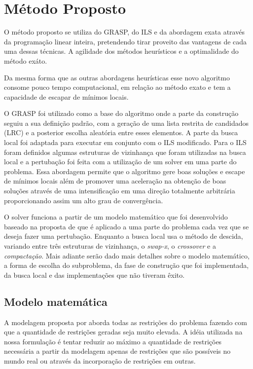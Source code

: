 \chapter{Método Proposto}
  
O método proposto se utiliza do GRASP, do ILS e da abordagem exata através da
programação linear inteira, pretendendo tirar proveito das vantagens de cada
uma dessas técnicas. A agilidade dos métodos heurísticos e a optimalidade do
método exáto.
  
Da mesma forma que as outras abordagens heurísticas esse novo algoritmo
consome pouco tempo computacional, em relação ao método exato e tem a capacidade
de escapar de mínimos locais.
  
O GRASP foi utilizado como a base do algoritmo onde a parte da construção
seguiu a sua definição padrão, com a geração de uma lista restrita de candidados
(LRC) e a posterior escolha aleatória entre esses elementos. A parte da busca
local foi adaptada para executar em conjunto com o ILS modificado. Para o ILS
foram definidos algumas estruturas de vizinhança que foram utilizadas
na busca local e a pertubação foi feita com a utilização de um solver em uma
parte do problema. Essa abordagem permite que o algoritmo gere boas
soluções e escape de mínimos locais além de promover uma aceleração na obtenção
de boas soluções através de uma intensificação em uma direção totalmente
arbitrária proporcionando assim um alto grau de convergência.


O solver funciona a partir de um modelo matemático que foi desenvolvido baseado
na proposta de \cite{pontes2002} que é aplicado a uma parte do problema cada
vez que se deseja fazer uma pertubação. Enquanto a busca local usa o método de
descida, variando entre três estruturas de vizinhança, o \textit{swap-x}, o
\textit{crossover} e a \textit{compactação}. Mais adiante serão dado mais
detalhes sobre o modelo matemático, a forma de escolha do subproblema, da fase
de construção que foi implementada, da busca local e das implementações que não
tiveram êxito.

\section{Modelo matemática}

   
A modelagem proposta por \cite{pontes2002} aborda todas as restrições do
problema fazendo com que a quantidade de restrições geradas seja muito elevada.
A idéia utilizada na nossa formulação é tentar reduzir ao máximo a quantidade de
restrições necessária a partir da modelagem apenas de restrições que são
possíveis no mundo real ou através da incorporação de restrições em outras.

